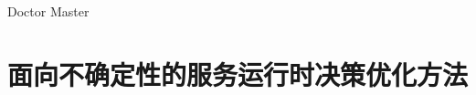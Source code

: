 \documentclass[cs4size,openany,UTF8]{ctexbook}
\begin{document}
\newif\ifxueweidoctor
\newif\ifxueweimaster
\def\temp{Doctor}
\ifx\temp\xuewei
  \xueweidoctortrue  \xueweimasterfalse
\fi
\def\temp{Master}
\ifx\temp\xuewei
  \xueweidoctorfalse  \xueweimastertrue
\fi




\chapter{面向不确定性的服务运行时决策优化方法}





%
%
%
%



\addtolength{\bibsep}{-0.8em}

%
\end{document}
